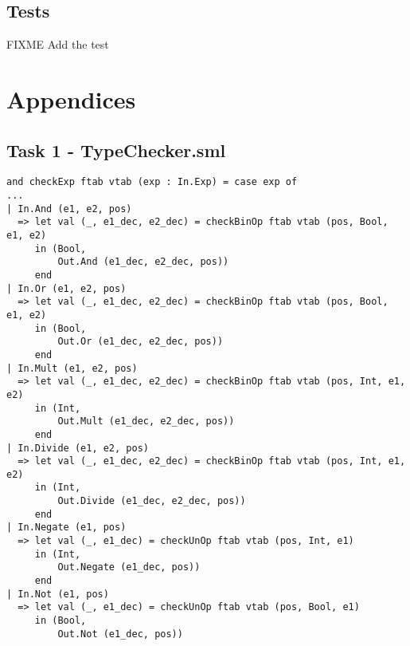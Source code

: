 \documentclass{article}
\begin{document}
\subsection{Tests}

FIXME Add the test

\section{Appendices}

\subsection{Task 1 - TypeChecker.sml}\label{app:1type}

\begin{lstlisting}
and checkExp ftab vtab (exp : In.Exp) = case exp of
...
| In.And (e1, e2, pos)
  => let val (_, e1_dec, e2_dec) = checkBinOp ftab vtab (pos, Bool, e1, e2)
     in (Bool,
         Out.And (e1_dec, e2_dec, pos))
     end
| In.Or (e1, e2, pos)
  => let val (_, e1_dec, e2_dec) = checkBinOp ftab vtab (pos, Bool, e1, e2)
     in (Bool,
         Out.Or (e1_dec, e2_dec, pos))
     end
| In.Mult (e1, e2, pos)
  => let val (_, e1_dec, e2_dec) = checkBinOp ftab vtab (pos, Int, e1, e2)
     in (Int,
         Out.Mult (e1_dec, e2_dec, pos))
     end
| In.Divide (e1, e2, pos)
  => let val (_, e1_dec, e2_dec) = checkBinOp ftab vtab (pos, Int, e1, e2)
     in (Int,
         Out.Divide (e1_dec, e2_dec, pos))
     end
| In.Negate (e1, pos)
  => let val (_, e1_dec) = checkUnOp ftab vtab (pos, Int, e1)
     in (Int,
         Out.Negate (e1_dec, pos))
     end
| In.Not (e1, pos)
  => let val (_, e1_dec) = checkUnOp ftab vtab (pos, Bool, e1)
     in (Bool,
         Out.Not (e1_dec, pos))
\end{lstlisting}
\end{document}
